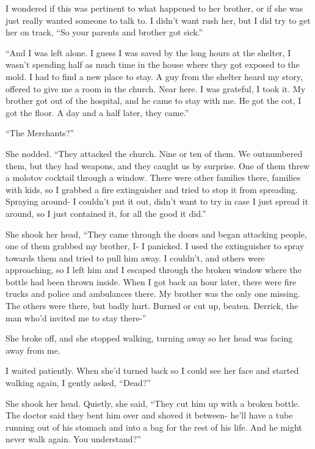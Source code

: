 I wondered if this was pertinent to what happened to her brother, or if she was just really wanted someone to talk to.  I didn't want rush her, but I did try to get her on track,  ``So your parents and brother got sick.''



``And I was left alone.  I guess I was saved by the long hours at the shelter, I wasn't spending half as much time in the house where they got exposed to the mold.  I had to find a new place to stay.  A guy from the shelter heard my story, offered to give me a room in the church.  Near here.  I was grateful, I took it.  My brother got out of the hospital, and he came to stay with me.  He got the cot, I got the floor.  A day and a half later, they came.''



``The Merchants?''



She nodded.  ``They attacked the church.  Nine or ten of them.  We outnumbered them, but they had weapons, and they caught us by surprise.  One of them threw a molotov cocktail through a window.  There were other families there, families with kids, so I grabbed a fire extinguisher and tried to stop it from spreading.  Spraying around- I couldn't put it out, didn't want to try in case I just spread it around, so I just contained it, for all the good it did.''



She shook her head, ``They came through the doors and began attacking people, one of them grabbed my brother, I- I panicked.  I used the extinguisher to spray towards them and tried to pull him away.  I couldn't, and others were approaching, so I left him and I escaped through the broken window where the bottle had been thrown inside.  When I got back an hour later, there were fire trucks and police and ambulances there.  My brother was the only one missing.  The others were there, but badly hurt.  Burned or cut up, beaten.  Derrick, the man who'd invited me to stay there-''



She broke off, and she stopped walking, turning away so her head was facing away from me.



I waited patiently.  When she'd turned back so I could see her face and started walking again, I gently asked, ``Dead?''



She shook her head.  Quietly, she said, ``They cut him up with a broken bottle.  The doctor said they bent him over and shoved it between- he'll have a tube running out of his stomach and into a bag for the rest of his life.  And he might never walk again.  You understand?''



